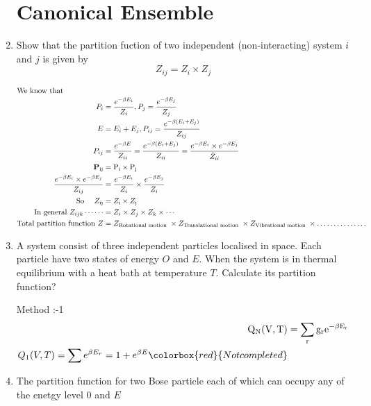 \begin{enumerate}
 \section{Canonical Ensemble}
	\item Show that the partition fuction of two independent (non-interacting)
	system $i$ and $j$ is given by 
	$$Z_{ij}=Z_i\times Z_j$$
	\begin{answer}
		\begin{align*}
		\intertext{We know that}
		P_{i}&=\frac{e^{-\beta E_{i}}}{Z_{i}}, P_{j}=\frac{e^{-\beta E_{j}}}{Z_{j}}\\
		E&=E_{i}+E_{j}, P_{i j}=\frac{e^{-\beta\left(E_{i}+E_{j}\right)}}{Z_{i j}}\\
		P_{i j}&=\frac{e^{-\beta E}}{Z_{i i}}=\frac{e^{-\beta\left(E_{i}+E_{j}\right)}}{Z_{i i}}=\frac{e^{-\beta E_{i}} \times e^{-\beta E_{j}}}{\dot{Z}_{i i}}\\
		\mathbf{P}_{\mathrm{ij}}&=\mathrm{P}_{\mathrm{i}} \times \mathrm{P}_{\mathrm{j}}\\
		\frac{e^{-\beta E_{i}} \times e^{-\beta E_{j}}}{Z_{i j}}&=\frac{e^{-\beta E_{i}}}{Z_{i}} \times \frac{e^{-\beta E_{j}}}{Z_{i}}\\
		\text{So  }\quad Z_{\mathrm{ij}}&=Z_{\mathrm{i}} \times Z_{\mathrm{j}}\\
	\text{	In general }Z_{i j k} \cdots \cdots&=Z_{i} \times Z_{j} \times Z_{k} \times \cdots \\
	\text{Total partition function }Z&=Z_{\text {Rotational motion }} \times Z_{\text {Translational motion }} \times Z_{\text {Vibrational motion }} \times \ldots \ldots \ldots \ldots \ldots
		\end{align*}
	\end{answer}
	\item A system consist of three independent particles localised in space. Each particle have two states of energy $O$ and $E$. When the system is in thermal equilibrium with a heat bath at temperature $T$. Calculate its partition function? 
 	\begin{answer}
 		Method :-1
 		\begin{align*}
 		\mathrm{Q}_{\mathrm{N}}(\mathrm{V}, \mathrm{T})&=\sum_{\mathrm{r}} \mathrm{g}_{\mathrm{r}} \mathrm{e}^{-\beta \mathrm{E}_{\mathrm{r}}}\\
 		Q_1 (V,T)=\sum e^{\beta E_r}=1+e^{\beta E}\colorbox{red}{Not completed}
 		\end{align*}
 	\end{answer}
	\item The partition function for two Bose particle each of which can occupy any of the enetgy level $0$ and $E$ 

\end{enumerate}
